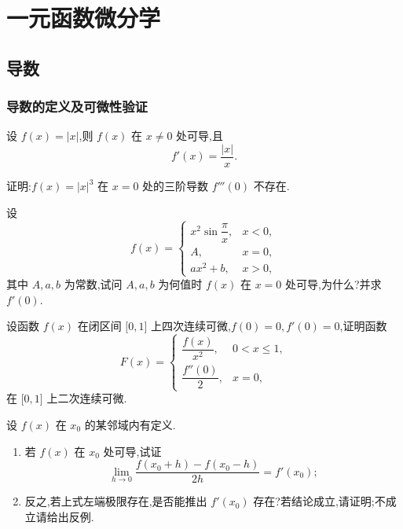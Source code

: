 \documentclass[../数学分析培优讲义.tex]{subfiles}
\begin{document}
\setcounter{chapter}{3}
\pagestyle{fancy}

\chapter{一元函数微分学}


\section{导数}


\subsection{导数的定义及可微性验证}

\begin{example}
设 $f(x)=|x|$,则 $f(x)$ 在 $x\neq0$ 处可导,且
\[
    f'(x)=\dfrac{|x|}{x}.
\]
\end{example}
\exampleblank

\begin{example}
证明:$f(x)=|x|^3$ 在 $x=0$ 处的三阶导数 $f'''(0)$ 不存在.
\end{example}
\exampleblank

\begin{example}
设
\[
f(x)=
\begin{cases}
    x^2\sin\dfrac{\pi}{x}, & x<0,\\
    A, & x=0,\\
    ax^2+b, & x>0,
\end{cases}
\]
其中 $A,a,b$ 为常数,试问 $A,a,b$ 为何值时 $f(x)$ 在 $x=0$ 处可导,为什么?并求 $f'(0)$.
\end{example}
\exampleblank

\begin{example}
设函数 $f(x)$ 在闭区间 $\lbrack 0,1\rbrack$ 上四次连续可微,$f(0)=0,f'(0)=0$,证明函数
\[
F(x)=
\begin{cases}
    \dfrac{f(x)}{x^2}, & 0<x\leq1,\\
    \dfrac{f''(0)}{2}, & x=0,
\end{cases}
\]
在 $\lbrack 0,1\rbrack$ 上二次连续可微.
\end{example}
\exampleblank

\begin{example}
设 $f(x)$ 在 $x_0$ 的某邻域内有定义.
\begin{enumerate}[label=(\arabic*)]
    \item 若 $f(x)$ 在 $x_0$ 处可导,试证
    \[
        \lim\limits_{h\to0}
        \dfrac{f(x_0+h)-f(x_0-h)}{2h}=f'(x_0);
    \]
    \item 反之,若上式左端极限存在,是否能推出 $f'(x_0)$ 存在?若结论成立,请证明;不成立请给出反例.
\end{enumerate}
\end{example}
\exampleblank
\end{document}
